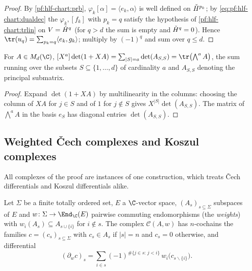 \begin{proof}
By \cref{pf:hlf-chart:prb}, $\varphi_k[\alpha]=\langle e_k,\alpha\rangle$ is well defined on $\check{H}^{p_k}$; by \eqref{eq:pf:hlf-chart:dualdec} the
$\varphi_k,[f_k]$ with $p_k=q$ satisfy the hypothesis of \cref{pf:hlf-chart:trlin} on $V=\check{H}^q$ (for $q>d$ the sum is empty and $\check{H}^q=0$).
Hence $\tr(u_q)=\sum_{p_k=q}\langle e_k,g_k\rangle$; multiply by $(-1)^q$ and sum over $q\le d$.
\end{proof}

\begin{lemma}\label{pf:hlf-chart:minorsum}
For $A\in M_d(\C)$, $[X^a]\det(1+XA)=\sum_{|S|=a}\det(A_{S,S})=\tr\bigl(\bigwedge^aA\bigr)$, the sum running over the subsets $S\subseteq\{1,\dots,d\}$
of cardinality $a$ and $A_{S,S}$ denoting the principal submatrix.
\end{lemma}

\begin{proof}
Expand $\det(1+XA)$ by multilinearity in the columns: choosing the column of $XA$ for $j\in S$ and of $1$ for $j\notin S$ gives
$X^{|S|}\det(A_{S,S})$. The matrix of $\bigwedge^aA$ in the basis $e_S$ has diagonal entries $\det(A_{S,S})$.
\end{proof}

\subsection{Weighted \v{C}ech complexes and Koszul complexes}\label{pf:hlf-chart:ss:cx}

All complexes of the proof are instances of one construction, which treats \v{C}ech differentials and Koszul differentials alike.

\begin{definition}\label{pf:hlf-chart:def:wcx}
Let $\Sigma$ be a finite totally ordered set, $E$ a $\C$-vector space, $(A_s)_{s\subseteq\Sigma}$ subspaces of $E$ and $w\colon\Sigma\to\End_\C(E)$
pairwise commuting endomorphisms (the \emph{weights}) with $w_i(A_s)\subseteq A_{s\cup\{i\}}$ for $i\notin s$. The complex $\mathcal C(A,w)$ has
$n$-cochains the families $c=(c_s)_{s\subseteq\Sigma}$ with $c_s\in A_s$ if $|s|=n$ and $c_s=0$ otherwise, and differential
\[
  (\partial_wc)_s=\sum_{i\in s}(-1)^{\#\{j\in s:\,j<i\}}\,w_i\bigl(c_{s\smallsetminus\{i\}}\bigr).
\]
\end{definition}

